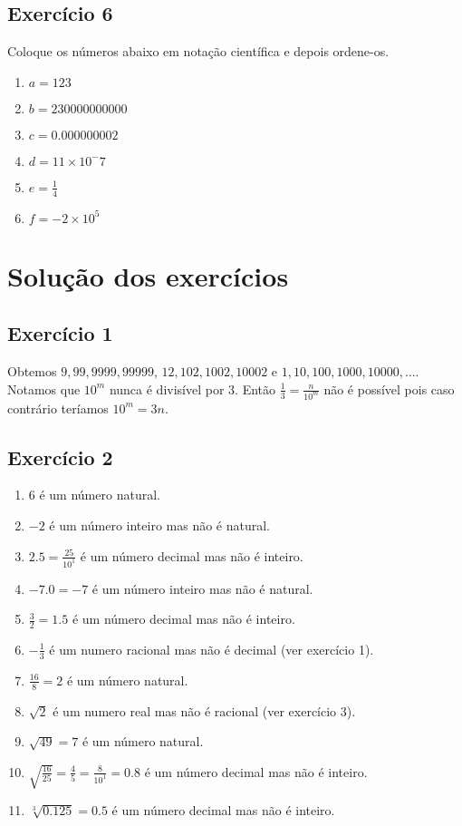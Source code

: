 \subsection*{Exercício 6}

Coloque os números abaixo em notação científica e depois ordene-os.

\begin{enumerate}
\item $a=123$
\item $b=230000000000$
\item $c=0.000000002$
\item $d=11 \times 10^-7$
\item $e=\frac{1}{4}$
\item $f=-2\times 10^5$
\end{enumerate}

\section{Solução dos exercícios}

\subsection*{Exercício 1}

Obtemos $9, 99, 9999, 99999$, $12, 102, 1002, 10002$ e
$1, 10, 100, 1000, 10000, \ldots$.
Notamos que $10^m$ nunca é divisível por $3$.
Então $\frac{1}{3} = \frac{n}{10^m}$ não é possível pois caso contrário teríamos
$10^m = 3n$.

\subsection*{Exercício 2}

\begin{enumerate}
\item $6$ é um número natural.
\item $-2$ é um número inteiro mas não é natural.
\item $2.5 = \frac{25}{10^1}$ é um número decimal mas não é inteiro.
\item $-7.0 = -7$ é um número inteiro mas não é natural.
\item $\frac{3}{2} = 1.5$ é um número decimal mas não é inteiro.
\item $-\frac{1}{3}$ é um numero racional mas não é decimal (ver exercício 1).
\item $\frac{16}{8} = 2$ é um número natural.
\item $\sqrt{2}$ é um numero real mas não é racional (ver exercício 3).
\item $\sqrt{49} = 7$ é um número natural.
\item $\sqrt{\frac{16}{25}} = \frac{4}{5} = \frac{8}{10^1} = 0.8$ é um número
decimal mas não é inteiro.
\item $\sqrt[3]{0.125} = 0.5$ é um número decimal mas não é inteiro.
\end{enumerate}

